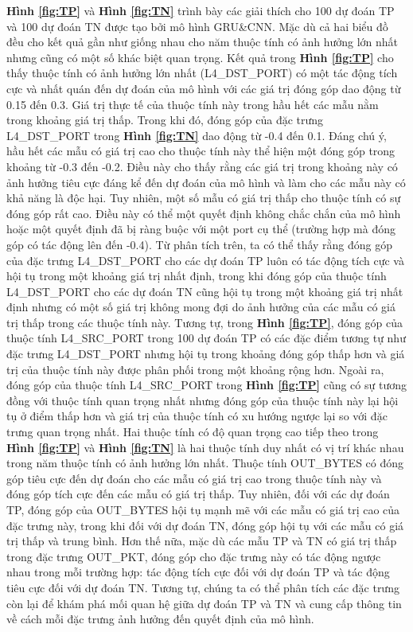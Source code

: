 \bigbreak\noindent
\textbf{Hình \ref{fig:TP}} và \textbf{Hình \ref{fig:TN}} trình bày các giải thích cho 100 dự đoán TP và 100 dự đoán TN được tạo bởi mô hình GRU\&CNN. Mặc dù cả hai biểu đồ đều cho kết quả gần như giống nhau cho năm thuộc tính có ảnh hưởng lớn nhất nhưng cũng có một số khác biệt quan trọng. Kết quả trong \textbf{Hình \ref{fig:TP}} cho thấy thuộc tính có ảnh hưởng lớn nhất (L4\_DST\_PORT) có một tác động tích cực và nhất quán đến dự đoán của mô hình với các giá trị đóng góp dao động từ 0.15 đến 0.3. Giá trị thực tế của thuộc tính này trong hầu hết các mẫu nằm trong khoảng giá trị thấp. Trong khi đó, đóng góp của đặc trưng L4\_DST\_PORT trong \textbf{Hình \ref{fig:TN}} dao động từ -0.4 đến 0.1. Đáng chú ý, hầu hết các mẫu có giá trị cao cho thuộc tính này thể hiện một đóng góp trong khoảng từ -0.3 đến -0.2. Điều này cho thấy rằng các giá trị trong khoảng này có ảnh hưởng tiêu cực đáng kể đến dự đoán của mô hình và làm cho các mẫu này có khả năng là độc hại. Tuy nhiên, một số mẫu có giá trị thấp cho thuộc tính có sự đóng góp rất cao. Điều này có thể một quyết định không chắc chắn của mô hình hoặc một quyết định đã bị ràng buộc với một port cụ thể (trường hợp mà đóng góp có tác động lên đến -0.4). Từ phân tích trên, ta có thể thấy rằng đóng góp của đặc trưng L4\_DST\_PORT cho các dự đoán TP luôn có tác động tích cực và hội tụ trong một khoảng giá trị nhất định, trong khi đóng góp của thuộc tính L4\_DST\_PORT cho các dự đoán TN cũng hội tụ trong một khoảng giá trị nhất định nhưng có một số giá trị không mong đợi do ảnh hưởng của các mẫu có giá trị thấp trong các thuộc tính này.
\bigbreak\noindent
Tương tự, trong \textbf{Hình \ref{fig:TP}}, đóng góp của thuộc tính L4\_SRC\_PORT trong 100 dự đoán TP có các đặc điểm tương tự như đặc trưng L4\_DST\_PORT nhưng hội tụ trong khoảng đóng góp thấp hơn và giá trị của thuộc tính này được phân phối trong một khoảng rộng hơn. Ngoài ra, đóng góp của thuộc tính L4\_SRC\_PORT trong \textbf{Hình \ref{fig:TP}} cũng có sự tương đồng với thuộc tính quan trọng nhất nhưng đóng góp của thuộc tính này lại hội tụ ở điểm thấp hơn và giá trị của thuộc tính có xu hướng ngược lại so với đặc trưng quan trọng nhất. Hai thuộc tính có độ quan trọng cao tiếp theo trong \textbf{Hình \ref{fig:TP}} và \textbf{Hình \ref{fig:TN}} là hai thuộc tính duy nhất có vị trí khác nhau trong năm thuộc tính có ảnh hưởng lớn nhất. Thuộc tính OUT\_BYTES có đóng góp tiêu cực đến dự đoán cho các mẫu có giá trị cao trong thuộc tính này và đóng góp tích cực đến các mẫu có giá trị thấp. Tuy nhiên, đối với các dự đoán TP, đóng góp của OUT\_BYTES hội tụ mạnh mẽ với các mẫu có giá trị cao của đặc trưng này, trong khi đối với dự đoán TN, đóng góp hội tụ với các mẫu có giá trị thấp và trung bình. Hơn thế nữa, mặc dù các mẫu TP và TN có giá trị thấp trong đặc trưng OUT\_PKT, đóng góp cho đặc trưng này có tác động ngược nhau trong mỗi trường hợp: tác động tích cực đối với dự đoán TP và tác động tiêu cực đối với dự đoán TN. Tương tự, chúng ta có thể phân tích các đặc trưng còn lại để khám phá mối quan hệ giữa dự đoán TP và TN và cung cấp thông tin về cách mỗi đặc trưng ảnh hưởng đến quyết định của mô hình.
